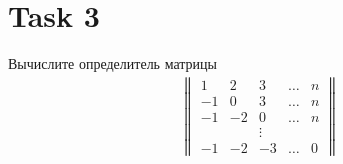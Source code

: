 \section{Task 3}
\begin{task}
    Вычислите определитель матрицы
    \begin{eqnarray}
        \begin{Vmatrix}
             1 &  2 &  3 & \ldots & n \\
            -1 &  0 &  3 & \ldots & n \\
            -1 & -2 &  0 & \ldots & n \\
               &    & \vdots & &   \\
            -1 & -2 & -3 & \ldots & 0
        \end{Vmatrix}
    \end{eqnarray}
\end{task}


